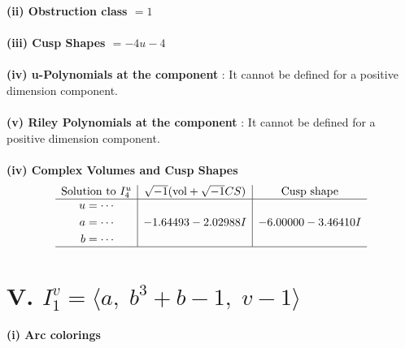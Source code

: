 \documentclass[1p]{elsarticle_modified}
\theoremstyle{definition}
\newcommand{\I}{\sqrt{-1}}
\begin{document}
\flushleft \textbf{(ii) Obstruction class $= 1$}\\~\\
\flushleft \textbf{(iii) Cusp Shapes $= -4 u-4$}\\~\\
\flushleft \textbf{(iv) u-Polynomials at the component} : It cannot be defined for a positive dimension component.\\~\\
\flushleft \textbf{(v) Riley Polynomials at the component} : It cannot be defined for a positive dimension component.\\~\\
\newpage\flushleft \textbf{(iv) Complex Volumes and Cusp Shapes}
$$\begin{array}{c|c|c} 
\text{Solution to }I^u_{4}& \I (\text{vol} + \sqrt{-1}CS) & \text{Cusp shape}\\
 \hline 
\begin{aligned}
u &= \cdots \\
a &= \cdots \\
b &= \cdots\end{aligned}
 & -1.64493 - 2.02988 I & -6.00000 - 3.46410 I\\
 \hline 
 \end{array}
$$\newpage\renewcommand{\arraystretch}{1}
\centering \section*{V. $I^v_{1}= \langle a,\;b^3+b-1,\;v-1 \rangle$}
\flushleft \textbf{(i) Arc colorings}\\
\end{document}
